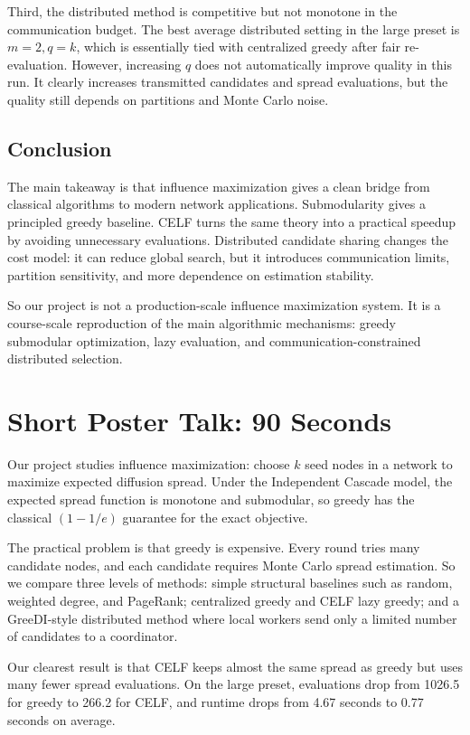 \documentclass[10pt]{article}
\begin{document}
Third, the distributed method is competitive but not monotone in the
communication budget. The best average distributed setting in the large preset
is \(m=2, q=k\), which is essentially tied with centralized greedy after fair
re-evaluation. However, increasing \(q\) does not automatically improve
quality in this run. It clearly increases transmitted candidates and spread
evaluations, but the quality still depends on partitions and Monte Carlo
noise.

\subsection*{Conclusion}

The main takeaway is that influence maximization gives a clean bridge from
classical algorithms to modern network applications. Submodularity gives a
principled greedy baseline. CELF turns the same theory into a practical speedup
by avoiding unnecessary evaluations. Distributed candidate sharing changes the
cost model: it can reduce global search, but it introduces communication
limits, partition sensitivity, and more dependence on estimation stability.

So our project is not a production-scale influence maximization system. It is
a course-scale reproduction of the main algorithmic mechanisms: greedy
submodular optimization, lazy evaluation, and communication-constrained
distributed selection.

\section{Short Poster Talk: 90 Seconds}

Our project studies influence maximization: choose \(k\) seed nodes in a
network to maximize expected diffusion spread. Under the Independent Cascade
model, the expected spread function is monotone and submodular, so greedy has
the classical \((1-1/e)\) guarantee for the exact objective.

The practical problem is that greedy is expensive. Every round tries many
candidate nodes, and each candidate requires Monte Carlo spread estimation. So
we compare three levels of methods: simple structural baselines such as random,
weighted degree, and PageRank; centralized greedy and CELF lazy greedy; and a
GreeDI-style distributed method where local workers send only a limited number
of candidates to a coordinator.

Our clearest result is that CELF keeps almost the same spread as greedy but
uses many fewer spread evaluations. On the large preset, evaluations drop from
1026.5 for greedy to 266.2 for CELF, and runtime drops from 4.67 seconds to
0.77 seconds on average.
\end{document}
